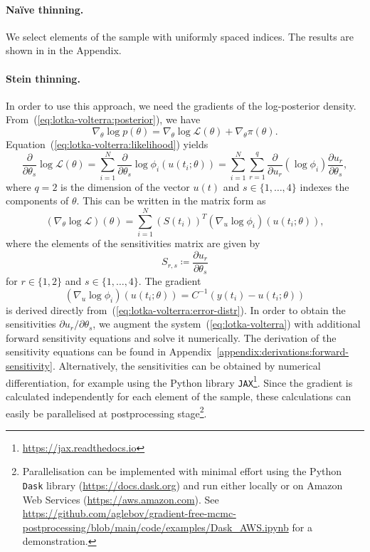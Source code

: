 \documentclass[11pt,a4paper]{report}
\begin{document}
\paragraph{Na\"ive thinning.} We select elements of the sample with uniformly spaced indices. The results are shown in  in the Appendix.

\paragraph{Stein thinning.} In order to use this approach, we need the gradients of the log-posterior density. From~(\ref{eq:lotka-volterra:posterior}), we have
\begin{equation*}
\nabla_{\theta} \log p(\theta) = \nabla_{\theta} \log \mathcal{L}(\theta) + \nabla_{\theta} \pi(\theta).
\end{equation*}
Equation~(\ref{eq:lotka-volterra:likelihood}) yields
\begin{equation*}
\frac{\partial}{\partial \theta_s} \log \mathcal{L}(\theta) 
= \sum_{i=1}^N \frac{\partial}{\partial \theta_s} \log \phi_i(u(t_i; \theta))
= \sum_{i=1}^N \sum_{r=1}^q \frac{\partial}{\partial u_r} (\log \phi_i) \frac{\partial u_r}{\partial \theta_s},
\end{equation*}
where $q = 2$ is the dimension of the vector $u(t)$ and $s \in \{1, \dots, 4\}$ indexes the components of $\theta$. This can be written in the matrix form as
\begin{equation*}
(\nabla_{\theta} \log \mathcal{L})(\theta) = \sum_{i=1}^N (S(t_i))^T (\nabla_{u} \log \phi_i)(u(t_i; \theta)),
\end{equation*}
where the elements of the sensitivities matrix are given by
\begin{equation*}
S_{r,s} \coloneq \frac{\partial u_r}{\partial \theta_s}
\end{equation*}
for $r \in \{1, 2\}$ and $s \in \{1, \dots, 4\}$.
The gradient
\begin{equation*}
(\nabla_u \log \phi_i)(u(t_i; \theta)) = C^{-1}(y(t_i) - u(t_i; \theta))
\end{equation*}
is derived directly from~(\ref{eq:lotka-volterra:error-distr}). In order to obtain the sensitivities $\partial u_r / \partial \theta_s$, we augment the system~(\ref{eq:lotka-volterra}) with additional forward sensitivity equations and solve it numerically. The derivation of the sensitivity equations can be found in Appendix~\ref{appendix:derivations:forward-sensitivity}. Alternatively, the sensitivities can be obtained by numerical differentiation, for example using the Python library \texttt{JAX}\footnote{\url{https://jax.readthedocs.io}}. Since the gradient is calculated independently for each element of the sample, these calculations can easily be parallelised at postprocessing stage\footnote{Parallelisation can be implemented with minimal effort using the Python \texttt{Dask} library (\url{https://docs.dask.org}) and run either locally or on Amazon Web Services (\url{https://aws.amazon.com}). See \url{https://github.com/aglebov/gradient-free-mcmc-postprocessing/blob/main/code/examples/Dask_AWS.ipynb} for a demonstration.}.
\end{document}

